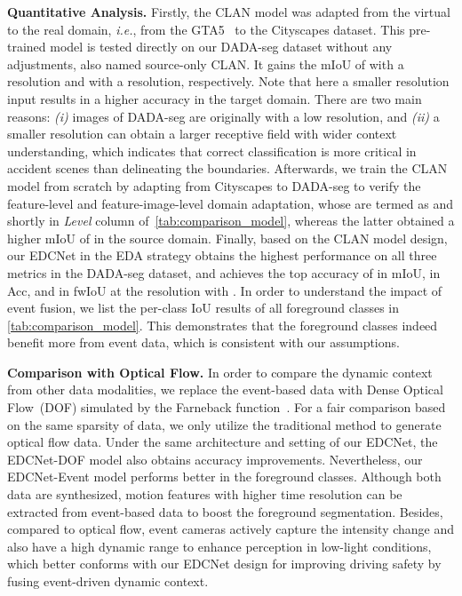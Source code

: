 \documentclass[journal]{IEEEtran}
\begin{document}
\textbf{Quantitative Analysis.}
Firstly, the CLAN model was adapted from the virtual to the real domain, \textit{i.e.}, from the GTA5~\cite{richter2016gta5} to the Cityscapes dataset. This pre-trained model is tested directly on our DADA-seg dataset without any adjustments, also named source-only CLAN. It gains the mIoU of  with a  resolution and  with a  resolution, respectively. Note that here a smaller resolution input results in a higher accuracy in the target domain. There are two main reasons: \textit{(i)} images of DADA-seg are originally with a low resolution, and \textit{(ii)} a smaller resolution can obtain a larger receptive field with wider context understanding, which indicates that correct classification is more critical in accident scenes than delineating the boundaries. Afterwards, we train the CLAN model from scratch by adapting from Cityscapes to DADA-seg to verify the feature-level and feature-image-level domain adaptation, whose are termed as  and  shortly in \textit{Level} column of~\cref{tab:comparison_model}, whereas the latter obtained a higher mIoU of  in the source domain. Finally, based on the CLAN model design, our EDCNet in the EDA strategy obtains the highest performance on all three metrics in the DADA-seg dataset, and achieves the top accuracy of  in mIoU,  in Acc, and  in fwIoU at the resolution with . In order to understand the impact of event fusion, we list the per-class IoU results of all  foreground classes in \cref{tab:comparison_model}. This demonstrates that the foreground classes indeed benefit more from event data, which is consistent with our assumptions. 


\textbf{Comparison with Optical Flow.}
In order to compare the dynamic context from other data modalities, we replace the event-based data with Dense Optical Flow~(DOF) simulated by the Farneback function~\cite{farneback2003DOF}. For a fair comparison based on the same sparsity of data, we only utilize the traditional method to generate optical flow data. Under the same architecture and setting of our EDCNet, the EDCNet-DOF model also obtains accuracy improvements. Nevertheless, our EDCNet-Event model performs better in the foreground classes. Although both data are synthesized, motion features with higher time resolution can be extracted from event-based data to boost the foreground segmentation. Besides, compared to optical flow, event cameras actively capture the intensity change and also have a high dynamic range to enhance perception in low-light conditions, which better conforms with our EDCNet design for improving driving safety by fusing event-driven dynamic context. 
\end{document}
